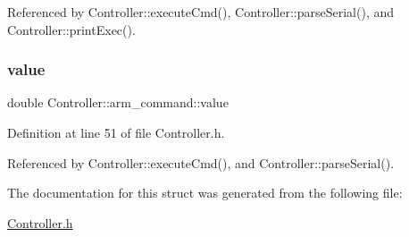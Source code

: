 Referenced by Controller\+::execute\+Cmd(), Controller\+::parse\+Serial(), and Controller\+::print\+Exec().

\mbox{\label{struct_controller_1_1arm__command_a2e40c7e8947f625f1d39ac9568a1976a}} 
\subsubsection{\texorpdfstring{value}{value}}
{\footnotesize\ttfamily double Controller\+::arm\+\_\+command\+::value}



Definition at line 51 of file Controller.\+h.



Referenced by Controller\+::execute\+Cmd(), and Controller\+::parse\+Serial().



The documentation for this struct was generated from the following file\+:\begin{DoxyCompactItemize}
\item 
\hyperlink{_controller_8h}{Controller.\+h}\end{DoxyCompactItemize}
